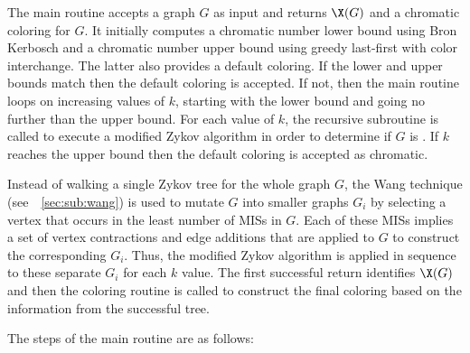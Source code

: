 The main routine accepts a graph \(G\) as input and returns \(\X(G)\) and a chromatic coloring for \(G\).  It
initially computes a chromatic number lower bound using Bron Kerbosch and a chromatic number upper bound using
greedy last-first with color interchange.  The latter also provides a default coloring.  If the lower and upper
bounds match then the default coloring is accepted.  If not, then the main routine loops on increasing values of
\(k\), starting with the lower bound and going no further than the upper bound.  For each value of \(k\), the
recursive subroutine is called to execute a modified Zykov algorithm in order to determine if \(G\) is
.  If \(k\) reaches the upper bound then the default coloring is accepted as chromatic.

Instead of walking a single Zykov tree for the whole graph \(G\), the Wang technique
(see~\sectionname~\ref{sec:sub:wang}) is used to mutate \(G\) into smaller graphs \(G_i\) by selecting a vertex
that occurs in the least number of MISs in \(G\).  Each of these MISs implies a set of vertex contractions and edge
additions that are applied to \(G\) to construct the corresponding \(G_i\).  Thus, the modified Zykov algorithm is
applied in sequence to these separate \(G_i\) for each \(k\) value.  The first successful return identifies
\(\X(G)\) and then the coloring routine is called to construct the final coloring based on the information from the
successful tree.

The steps of the main routine are as follows:

